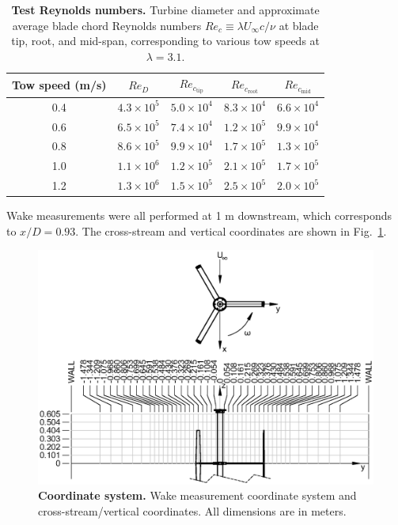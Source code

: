\documentclass[10pt,letterpaper]{article}
\begin{document}
\begin{table}[ht]
\centering
\begin{tabular}{c|c|c|c|c}
Tow speed (m/s) & $Re_D$ & $Re_{c_\mathrm{tip}}$ & $Re_{c_\mathrm{root}}$ & $Re_{c_\mathrm{mid}}$\\
\hline
0.4 & $4.3 \times 10^5$ & $5.0 \times 10^4$ & $8.3 \times 10^4$ & $6.6 \times 10^4$ \\
0.6 & $6.5 \times 10^5$ & $7.4 \times 10^4$ & $1.2 \times 10^5$ & $9.9 \times 10^4$ \\
0.8 & $8.6 \times 10^5$ & $9.9 \times 10^4$ & $1.7 \times 10^5$ & $1.3 \times 10^5$ \\
1.0 & $1.1 \times 10^6$ & $1.2 \times 10^5$ & $2.1 \times 10^5$ & $1.7 \times 10^5$ \\
1.2 & $1.3 \times 10^6$ & $1.5 \times 10^5$ & $2.5 \times 10^5$ & $2.0 \times 10^5$ \\
\end{tabular}

\caption{{\bf Test Reynolds numbers.} Turbine diameter and approximate average
blade chord Reynolds numbers $Re_c \equiv \lambda U_\infty c / \nu$ at blade
tip, root, and mid-span, corresponding to various tow speeds at $\lambda=3.1$.}

\label{tab:re}
\end{table}

Wake measurements were all performed at 1 m downstream, which corresponds to
$x/D = 0.93$. The cross-stream and vertical coordinates are shown in
Fig.~\ref{fig:coordinates}.

\begin{figure}[h]
    \includegraphics[width=\textwidth]{figures/turbine_coordinate_system.eps}

    \caption{{\bf Coordinate system.} Wake measurement coordinate system and
    cross-stream/vertical coordinates. All dimensions are in meters.}

    \label{fig:coordinates}
\end{figure}
\end{document}
